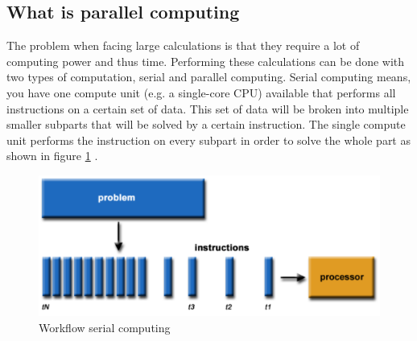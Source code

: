 \documentclass[a4paper, 11pt]{report}
\begin{document}
	\subsection{What is parallel computing}
The problem when facing large calculations is that they require a lot of computing power and thus time. Performing these calculations can be done with two types of computation, serial and parallel computing. Serial computing means, you have one compute unit (e.g. a single-core CPU) available that performs all instructions on a certain set of data. This set of data will be broken into multiple smaller subparts that will be solved by a certain instruction. The single compute unit performs the instruction on every subpart in order to solve the whole part as shown in figure \ref{fig:SerialC} \cite{barney2012parallel}.
	\begin{figure}[ht]
		\centering
		\includegraphics[scale=.4]{images/serialProblem.pdf}
		\caption{Workflow serial computing}
		\label{fig:SerialC}
	\end{figure}
\end{document}
